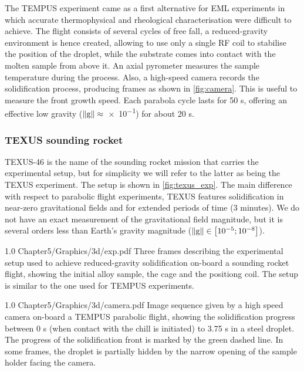 The TEMPUS experiment came as a first alternative for EML experiments in which accurate thermophysical and rheological characterisation were difficult to achieve.
The flight consists of several cycles of free fall, a reduced-gravity environment is hence created, 
allowing to use only a single RF coil to stabilise the position of the droplet, while the substrate comes into contact with the molten sample
from above it. An axial pyrometer measures the sample temperature during the process. 
Also, a high-speed camera records the solidification process, producing frames as shown in \cref{fig:camera}.
This is useful to measure the front growth speed. 
Each parabola cycle lasts for 50 s, offering an effective low gravity ($\lVert \boldsymbol{\text{g}} \rVert\approx$\SI{e-1}{\uacceleration}) for about 20 s.

\subsubsection{TEXUS sounding rocket}

TEXUS-46 is the name of the sounding rocket mission that carries the experimental setup, 
but for simplicity we will refer to the latter as being the TEXUS experiment. The setup is shown in \cref{fig:texus_exp}.
The main difference with respect to parabolic flight experiments,
TEXUS features solidification in near-zero gravitational fields and for extended periods of time (3 minutes). 
We do not have an exact measurement of the gravitational field magnitude, but it is several orders
less than Earth's gravity magnitude ($\lVert \boldsymbol{\text{g}} \rVert \in \left[ 10^{-5};10^{-8} \right]$\si{\uacceleration}).

\begin{figureth}
{1.0}
{Chapter5/Graphics/3d/exp.pdf}
{Three frames describing the experimental setup used to achieve reduced-gravity 
solidification on-board a sounding rocket flight,
showing the initial alloy sample, the cage and the positiong coil. The setup
is similar to the one used for TEMPUS experiments.}
\label{fig:texus_exp}
\end{figureth}

\begin{figureth}
{1.0}
{Chapter5/Graphics/3d/camera.pdf}
{Image sequence given by a high speed camera on-board a TEMPUS parabolic flight, showing the 
solidification progress between 0 s (when contact with the chill is initiated) to 3.75 s in a  steel droplet. 
The progress of the solidification front is marked by the green dashed line. In some frames, the droplet is partially hidden by the narrow 
opening of the sample holder facing the camera.}
\label{fig:camera}
\end{figureth}

